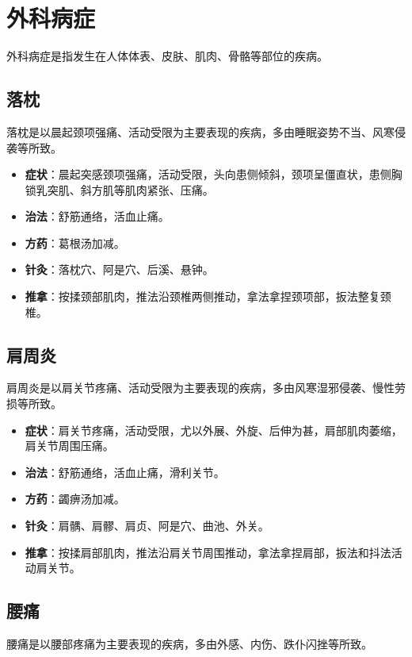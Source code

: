 \documentclass[12pt,UTF8]{ctexbook}
\begin{document}
\section{外科病症}

外科病症是指发生在人体体表、皮肤、肌肉、骨骼等部位的疾病。

\subsection{落枕}

落枕是以晨起颈项强痛、活动受限为主要表现的疾病，多由睡眠姿势不当、风寒侵袭等所致。

\begin{itemize}
\item \textbf{症状}：晨起突感颈项强痛，活动受限，头向患侧倾斜，颈项呈僵直状，患侧胸锁乳突肌、斜方肌等肌肉紧张、压痛。
\item \textbf{治法}：舒筋通络，活血止痛。
\item \textbf{方药}：葛根汤加减。
\item \textbf{针灸}：落枕穴、阿是穴、后溪、悬钟。
\item \textbf{推拿}：按揉颈部肌肉，推法沿颈椎两侧推动，拿法拿捏颈项部，扳法整复颈椎。
\end{itemize}

\subsection{肩周炎}

肩周炎是以肩关节疼痛、活动受限为主要表现的疾病，多由风寒湿邪侵袭、慢性劳损等所致。

\begin{itemize}
\item \textbf{症状}：肩关节疼痛，活动受限，尤以外展、外旋、后伸为甚，肩部肌肉萎缩，肩关节周围压痛。
\item \textbf{治法}：舒筋通络，活血止痛，滑利关节。
\item \textbf{方药}：蠲痹汤加减。
\item \textbf{针灸}：肩髃、肩髎、肩贞、阿是穴、曲池、外关。
\item \textbf{推拿}：按揉肩部肌肉，推法沿肩关节周围推动，拿法拿捏肩部，扳法和抖法活动肩关节。
\end{itemize}

\subsection{腰痛}

腰痛是以腰部疼痛为主要表现的疾病，多由外感、内伤、跌仆闪挫等所致。
\end{document}
